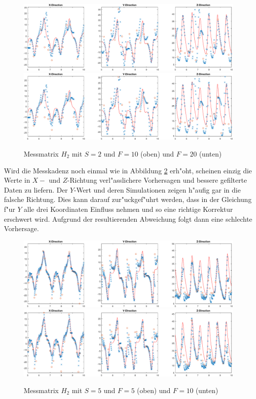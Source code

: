 \begin{refsection}
\begin{figure}
\centering
\includegraphics[width=\hsize]{kalman/figures/H2R10S2.pdf}
\includegraphics[width=\hsize]{kalman/figures/H2R20S2.pdf}
\caption{Messmatrix $H_{2}$ mit $S=2$ und $F=10$ (oben) und $F=20$ (unten)}
\label{kalman:H2S2}
\end{figure}

Wird die Messkadenz noch einmal wie in Abbildung \ref{kalman:H2S5} erh"oht, scheinen einzig die Werte in $X-$ und $Z$-Richtung verl"asslichere Vorhersagen und bessere gefilterte Daten zu liefern. Der $Y$-Wert und deren Simulationen zeigen h"aufig gar in die falsche Richtung. Dies kann darauf zur"uckgef"uhrt werden, dass in der Gleichung f"ur $Y$ alle drei Koordinaten Einfluss nehmen und so eine richtige Korrektur erschwert wird. Aufgrund der resultierenden Abweichung folgt dann eine schlechte Vorhersage.

\begin{figure}
\centering
\includegraphics[width=\hsize]{kalman/figures/H2R05S5.pdf}
\includegraphics[width=\hsize]{kalman/figures/H2R10S5.pdf}
\caption{Messmatrix $H_{2}$ mit $S=5$ und $F=5$ (oben) und $F=10$ (unten)}
\label{kalman:H2S5}
\end{figure}


\end{refsection}
